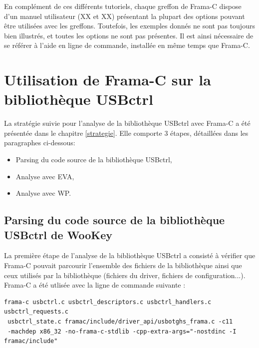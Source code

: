 \noindent En complément de ces différents tutoriels, chaque greffon de Frama-C dispose d'un manuel utilisateur (XX et XX) présentant la plupart des options pouvant être utilisées avec les greffons. Toutefois, les exemples donnés ne sont pas toujours bien illustrés, et toutes les options ne sont pas présentes. Il est ainsi nécessaire de se référer à l'aide en ligne de commande, installée en même temps que Frama-C.

\section{Utilisation de Frama-C sur la bibliothèque USBctrl}

La stratégie suivie pour l'analyse de la bibliothèque USBctrl avec Frama-C a été présentée dans le chapitre \ref{strategie}. Elle comporte 3 étapes, détaillées dans les paragraphes ci-dessous:
\begin{itemize}
	\item Parsing du code source de la bibliothèque USBctrl,
	\item Analyse avec EVA,
	\item Analyse avec WP.
\end{itemize}


\subsection{Parsing du code source de la bibliothèque USBctrl de WooKey}

La première étape de l'analyse de la bibliothèque USBctrl a consisté à vérifier que Frama-C pouvait parcourir l'ensemble des fichiers de la bibliothèque ainsi que ceux utilisés par la bibliothèque (fichiers du driver, fichiers de configuration...). Frama-C a été utlisée avec la ligne de commande suivante :
\begin{lstlisting}[style=CStyle]
frama-c usbctrl.c usbctrl_descriptors.c usbctrl_handlers.c usbctrl_requests.c
 usbctrl_state.c framac/include/driver_api/usbotghs_frama.c -c11
 -machdep x86_32 -no-frama-c-stdlib -cpp-extra-args="-nostdinc -I framac/include"
\end{lstlisting}

